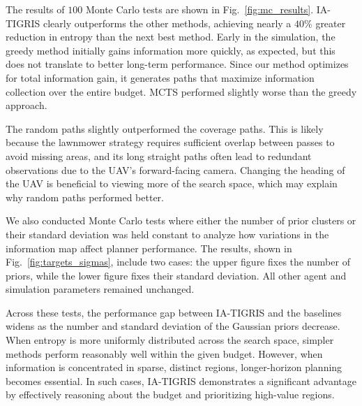 The results of $100$ Monte Carlo tests are shown in Fig.~\ref{fig:mc_results}. IA-TIGRIS clearly outperforms the other methods, achieving nearly a $40\%$ greater reduction in entropy than the next best method. Early in the simulation, the greedy method initially gains information more quickly, as expected, but this does not translate to better long-term performance. Since our method optimizes for total information gain, it generates paths that maximize information collection over the entire budget. MCTS performed slightly worse than the greedy approach.

The random paths slightly outperformed the coverage paths. This is likely because the lawnmower strategy requires sufficient overlap between passes to avoid missing areas, and its long straight paths often lead to redundant observations due to the UAV’s forward-facing camera. Changing the heading of the UAV is beneficial to viewing more of the search space, which may explain why random paths performed better.

We also conducted Monte Carlo tests where either the number of prior clusters or their standard deviation was held constant to analyze how variations in the information map affect planner performance. The results, shown in Fig.~\ref{fig:targets_sigmas}, include two cases: the upper figure fixes the number of priors, while the lower figure fixes their standard deviation. All other agent and simulation parameters remained unchanged.



Across these tests, the performance gap between IA-TIGRIS and the baselines widens as the number and standard deviation of the Gaussian priors decrease. When entropy is more uniformly distributed across the search space, simpler methods perform reasonably well within the given budget. However, when information is concentrated in sparse, distinct regions, longer-horizon planning becomes essential. In such cases, IA-TIGRIS demonstrates a significant advantage by effectively reasoning about the budget and prioritizing high-value regions.

